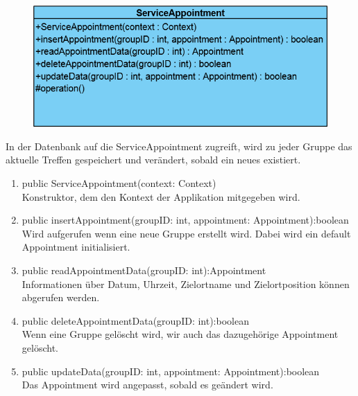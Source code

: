 \begin{figure}[H]
	\includegraphics[scale = .5]{res/umlClasses/ServiceAppointment.png}
	\centering
\end{figure}
In der Datenbank auf die ServiceAppointment zugreift, wird zu jeder Gruppe das aktuelle Treffen gespeichert und verändert, sobald ein neues existiert.
\begin{enumerate}
	\item public ServiceAppointment(context: Context)\\
		Konstruktor, dem den Kontext der Applikation mitgegeben wird.
	\item public insertAppointment(groupID: int, appointment: Appointment):boolean\\
		Wird aufgerufen wenn eine neue Gruppe erstellt wird. Dabei wird ein default Appointment initialisiert.
	\item public readAppointmentData(groupID: int):Appointment \\
		Informationen über Datum, Uhrzeit, Zielortname und Zielortposition können abgerufen werden.
	\item public deleteAppointmentData(groupID: int):boolean \\
		Wenn eine Gruppe gelöscht wird, wir auch das dazugehörige Appointment gelöscht.
	\item public updateData(groupID: int, appointment: Appointment):boolean \\
		Das Appointment wird angepasst, sobald es geändert wird.
\end{enumerate}

